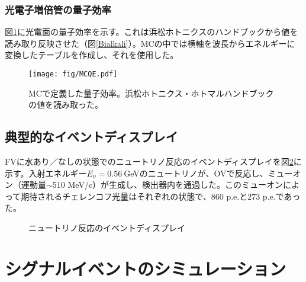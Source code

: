 \documentclass[11pt]{jreport}
\newcommand{\figref}[1]{図\ref{#1}}
\begin{document}
\subsubsection{光電子増倍管の量子効率}
\figref{MCQE}に光電面の量子効率を示す。これは浜松ホトニクスのハンドブックから値を読み取り反映させた（\figref{Bialkali}）。MCの中では横軸を波長からエネルギーに変換したテーブルを作成し、それを使用した。

\begin{figure}[htbp]
\centering
\texttt{[image: fig/MCQE.pdf]}
\caption[MCで定義した量子効率]{MCで定義した量子効率。浜松ホトニクス・ホトマルハンドブックの値を読み取った。}
\label{MCQE}
\end{figure}



\subsection{典型的なイベントディスプレイ}

FVに水あり／なしの状態でのニュートリノ反応のイベントディスプレイを\figref{MCEvtDsp}に示す。入射エネルギー$E_{\nu}=0.56\ $GeVのニュートリノが、OVで反応し、ミューオン（運動量$\sim$510 MeV/c）が生成し、検出器内を通過した。このミューオンによって期待されるチェレンコフ光量はそれぞれの状態で、860 p.e.と273 p.e.であった。

\begin{figure}[htbp]
  \begin{minipage}{0.47\textwidth}
  \end{minipage}
  \hfill
  \begin{minipage}{0.47\textwidth}
  \end{minipage}
    \caption{ニュートリノ反応のイベントディスプレイ}
  \label{MCEvtDsp}
\end{figure}


\section{シグナルイベントのシミュレーション}
\end{document}
